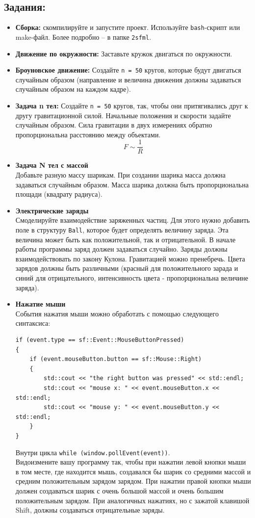 \documentclass{article}
\begin{document}
\subsection*{Задания:}
\begin{itemize}
\item \textbf{Сборка:} скомпилируйте и запустите проект. Используйте \texttt{bash}-скрипт или make-файл. Более подробно -- в папке \texttt{2sfml}.
\item \textbf{Движение по окружности:} Заставьте кружок двигаться по окружности. 
\item \textbf{Броуновское движение:} Создайте \texttt{n = 50} кругов, которые будут двигаться случайным образом (направление и величина движения должны задаваться случайным образом на каждом кадре).
\item \textbf{Задача n тел:} Создайте \texttt{n = 50} кругов, так, чтобы они притягивались друг к другу гравитационной силой. Начальные положения и скорости задайте случайным образом. Сила гравитации в двух измерениях обратно пропорциональна расстоянию между объектами.
$$
F \sim \frac{1}{R}
$$
\item \textbf{Задача N тел с массой} \\
Добавьте разную массу шарикам. При создании шарика масса должна задаваться случайным образом. Масса шарика должна быть пропорциональна площади (квадрату радиуса).
\item \textbf{Электрические заряды} \\
Смоделируйте взаимодействие заряженных частиц. Для этого нужно добавить поле в структуру \texttt{Ball}, которое будет определять величину заряда. Эта величина может быть как положительной, так и отрицательной. В начале работы программы заряд должен задаваться случайно. Заряды должны взаимодействовать по закону Кулона. Гравитацией можно пренебречь. Цвета зарядов должны быть различными (красный для положительного зарада и синий для отрицательного, интенсивность цвета - пропорциональна величине заряда).
\item \textbf{Нажатие мыши} \\
События нажатия мыши можно обработать с помощью следующего синтаксиса:
\begin{lstlisting}
if (event.type == sf::Event::MouseButtonPressed) 
{
    if (event.mouseButton.button == sf::Mouse::Right) 
    {
        std::cout << "the right button was pressed" << std::endl;
        std::cout << "mouse x: " << event.mouseButton.x << std::endl;
        std::cout << "mouse y: " << event.mouseButton.y << std::endl;
    }
}
\end{lstlisting}
Внутри цикла \texttt{while (window.pollEvent(event))}.\\
Видоизмените вашу программу так, чтобы при нажатии левой кнопки мыши в том месте, где находится мышь, создавался бы шарик со средними массой и средним положительным зарядом зарядом. При нажатии правой кнопки мыши должен создаваться шарик с очень большой  массой и очень большим положительным зарядом. При аналогичных нажатиях, но с зажатой клавишой Shift, должны создаваться отрицательные заряды.
\end{itemize}
\end{document}
